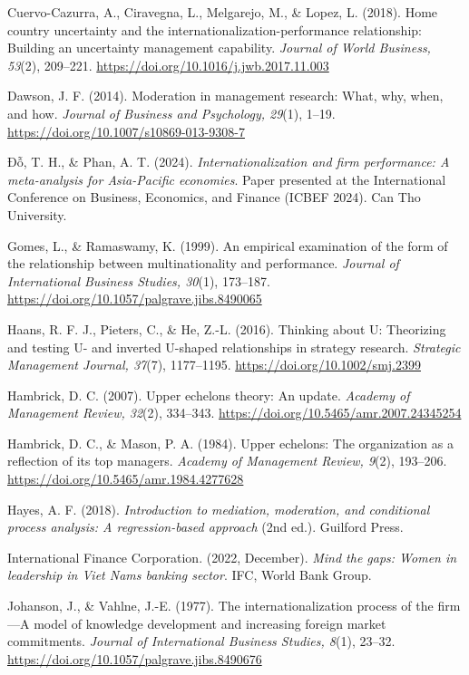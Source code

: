 \documentclass[12pt,a4paper]{article}
\begin{document}
Cuervo-Cazurra, A., Ciravegna, L., Melgarejo, M., \& Lopez, L. (2018).
Home country uncertainty and the internationalization-performance
relationship: Building an uncertainty management capability.
\emph{Journal of World Business, 53}(2), 209--221.
\url{https://doi.org/10.1016/j.jwb.2017.11.003}

Dawson, J. F. (2014). Moderation in management research: What, why,
when, and how. \emph{Journal of Business and Psychology, 29}(1), 1--19.
\url{https://doi.org/10.1007/s10869-013-9308-7}

Đỗ, T. H., \& Phan, A. T. (2024). \emph{Internationalization and firm
performance: A meta-analysis for Asia-Pacific economies}. Paper
presented at the International Conference on Business, Economics, and
Finance (ICBEF 2024). Can Tho University.

Gomes, L., \& Ramaswamy, K. (1999). An empirical examination of the form
of the relationship between multinationality and performance.
\emph{Journal of International Business Studies, 30}(1), 173--187.
\url{https://doi.org/10.1057/palgrave.jibs.8490065}

Haans, R. F. J., Pieters, C., \& He, Z.-L. (2016). Thinking about U:
Theorizing and testing U- and inverted U-shaped relationships in
strategy research. \emph{Strategic Management Journal, 37}(7),
1177--1195. \url{https://doi.org/10.1002/smj.2399}

Hambrick, D. C. (2007). Upper echelons theory: An update. \emph{Academy
of Management Review, 32}(2), 334--343.
\url{https://doi.org/10.5465/amr.2007.24345254}

Hambrick, D. C., \& Mason, P. A. (1984). Upper echelons: The
organization as a reflection of its top managers. \emph{Academy of
Management Review, 9}(2), 193--206.
\url{https://doi.org/10.5465/amr.1984.4277628}

Hayes, A. F. (2018). \emph{Introduction to mediation, moderation, and
conditional process analysis: A regression-based approach} (2nd ed.).
Guilford Press.

International Finance Corporation. (2022, December). \emph{Mind the
gaps: Women in leadership in Viet Nam\textquotesingle s banking sector}.
IFC, World Bank Group.

Johanson, J., \& Vahlne, J.-E. (1977). The internationalization process
of the firm---A model of knowledge development and increasing foreign
market commitments. \emph{Journal of International Business Studies,
8}(1), 23--32. \url{https://doi.org/10.1057/palgrave.jibs.8490676}
\end{document}
